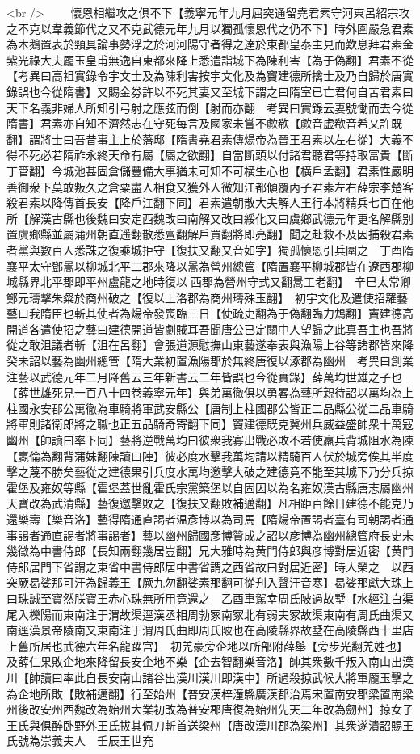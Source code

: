 <br />
　　懷恩相繼攻之俱不下【義寧元年九月屈突通留堯君素守河東呂紹宗攻之不克以韋義節代之又不克武德元年九月以獨孤懷恩代之仍不下】時外圍嚴急君素為木鵝置表於頸具論事勢浮之於河河陽守者得之達於東都皇泰主見而歎息拜君素金紫光祿大夫龎玉皇甫無逸自東都來降上悉遣詣城下為陳利害【為于偽翻】君素不從　【考異曰高祖實錄令宇文士及為陳利害按宇文化及為竇建德所擒士及乃自歸於唐實錄誤也今從隋書】又賜金劵許以不死其妻又至城下謂之曰隋室已亡君何自苦君素曰天下名義非婦人所知引弓射之應弦而倒【射而亦翻　考異曰實錄云妻號慟而去今從隋書】君素亦自知不濟然志在守死每言及國家未嘗不歔欷【歔音虚欷音希又許既翻】謂將士曰吾昔事主上於藩邸【隋書堯君素傳煬帝為晉王君素以左右從】大義不得不死必若隋祚永終天命有屬【屬之欲翻】自當斷頭以付諸君聽君等持取富貴【斷丁管翻】今城池甚固倉儲豐備大事猶未可知不可横生心也【横戶孟翻】君素性嚴明善御衆下莫敢叛久之倉粟盡人相食又獲外人微知江都傾覆丙子君素左右薛宗李楚客殺君素以降傳首長安【降戶江翻下同】君素遣朝散大夫解人王行本將精兵七百在他所【解漢古縣也後魏曰安定西魏改曰南解又改曰綏化又曰虞鄉武德元年更名解縣别置虞鄉縣並屬蒲州朝直遥翻散悉亶翻解戶買翻將即亮翻】聞之赴救不及因捕殺君素者黨與數百人悉誅之復乘城拒守【復扶又翻又音如字】獨孤懷恩引兵圍之　丁酉隋襄平太守鄧暠以柳城北平二郡來降以暠為營州總管【隋置襄平柳城郡皆在遼西郡柳城縣界北平郡即平州盧龍之地時復以西郡為營州守式又翻暠工老翻】　辛巳太常卿鄭元璹擊朱粲於商州破之【復以上洛郡為商州璹殊玉翻】　初宇文化及遣使招羅藝藝曰我隋臣也斬其使者為煬帝發喪臨三日【使疏吏翻為于偽翻臨力鴆翻】竇建德高開道各遣使招之藝曰建德開道皆劇賊耳吾聞唐公已定關中人望歸之此真吾主也吾將從之敢沮議者斬【沮在呂翻】會張道源慰撫山東藝遂奉表與漁陽上谷等諸郡皆來降癸未詔以藝為幽州總管【隋大業初置漁陽郡於無終唐復以涿郡為幽州　考異曰創業注藝以武德元年二月降舊云三年新書云二年皆誤也今從實錄】薛萬均世雄之子也【薛世雄死見一百八十四卷義寧元年】與弟萬徹俱以勇畧為藝所親待詔以萬均為上柱國永安郡公萬徹為車騎將軍武安縣公【唐制上柱國郡公皆正二品縣公從二品車騎將軍則諸衛郎將之職也正五品騎奇寄翻下同】竇建德既克冀州兵威益盛帥衆十萬寇幽州【帥讀曰率下同】藝將逆戰萬均曰彼衆我寡出戰必敗不若使羸兵背城阻水為陳【羸倫為翻背蒲妹翻陳讀曰陣】彼必度水擊我萬均請以精騎百人伏於城旁俟其半度擊之蔑不勝矣藝從之建德果引兵度水萬均邀擊大破之建德竟不能至其城下乃分兵掠霍堡及雍奴等縣【霍堡蓋世亂霍氏宗黨築堡以自固因以為名雍奴漢古縣唐志屬幽州天寶改為武清縣】藝復邀擊敗之【復扶又翻敗補邁翻】凡相距百餘日建德不能克乃還樂壽【樂音洛】藝得隋通直謁者温彥博以為司馬【隋煬帝置謁者臺有司朝謁者通事謁者通直謁者將事謁者】藝以幽州歸國彥博贊成之詔以彦博為幽州總管府長史未幾徵為中書侍郎【長知兩翻幾居豈翻】兄大雅時為黄門侍郎與彦博對居近密【黄門侍郎居門下省謂之東省中書侍郎居中書省謂之西省故曰對居近密】時人榮之　以西突厥曷娑那可汗為歸義王【厥九勿翻娑素那翻可從刋入聲汗音寒】曷娑那獻大珠上曰珠誠至寶然朕寶王赤心珠無所用竟還之　乙酉車駕幸周氏陂過故墅【水經注白渠尾入櫟陽而東南注于渭故渠逕漢丞相周勃冢南冢北有弱夫冢故渠東南有周氏曲渠又南逕漢景帝陵南又東南注于渭周氏曲即周氏陂也在高陵縣界故墅在高陵縣西十里店上舊所居也武德六年名龍躍宫】　初羌豪旁企地以所部附薛舉【旁步光翻羌姓也】及薛仁果敗企地來降留長安企地不樂【企去智翻樂音洛】帥其衆數千叛入南山出漢川【帥讀曰率此自長安南山諸谷出漢川漢川即漢中】所過殺掠武候大將軍龎玉擊之為企地所敗【敗補邁翻】行至始州【普安漢梓潼縣廣漢郡治焉宋置南安郡梁置南梁州後改安州西魏改為始州大業初改為普安郡唐復為始州先天二年改為劒州】掠女子王氏與俱醉卧野外王氏拔其佩刀斬首送梁州【唐改漢川郡為梁州】其衆遂潰詔賜王氏號為崇義夫人　壬辰王世充